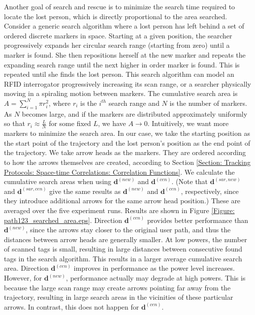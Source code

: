 Another goal of search and rescue is to minimize the search time required to locate the lost person, which is directly proportional to the area searched.  Consider a generic search algorithm where a lost person has left behind a set of ordered discrete markers in space.  Starting at a given position, the searcher progressively expands her circular search range (starting from zero) until a marker is found.  She then repositions herself at the new marker and repeats the expanding search range until the next higher in order marker is found.  This is repeated until she finds the lost person.  This search algorithm can model an RFID interrogator progressively increasing its scan range, or a searcher physically moving in a spiraling motion between markers.  The cumulative search area is $A = \sum_{i = 1}^N \pi r_i^2$, where $r_i$ is the $i^{th}$ search range and $N$ is the number of markers.  As $N$ becomes large, and if the markers are distributed approximately uniformly so that $r_i \approx \frac{L}{N}$ for some fixed $L$, we have $A \rightarrow 0$.  Intuitively, we want more markers to minimize the search area.  In our case, we take the starting position as the start point of the trajectory and the lost person's position as the end point of the trajectory.  We take arrow heads as the markers.  They are ordered according to how the arrows themselves are created, according to Section \ref{Section: Tracking Protocols: Space-time Correlations: Correlation Functions}.  We calculate the cumulative search areas when using $\mathbf{d}^{\left(new\right)}$ and $\mathbf{d}^{\left(cen\right)}$.  (Note that $\mathbf{d}^{\left(sar, new\right)}$ and $\mathbf{d}^{\left(sar, cen\right)}$ give the same results as $\mathbf{d}^{\left(new\right)}$ and $\mathbf{d}^{\left(cen\right)}$, respectively, since they introduce additional arrows for the same arrow head position.)  These are averaged over the five experiment runs.  Results are shown in Figure \ref{Figure: path123_searched_area.eps}. Direction $\mathbf{d}^{\left(cen\right)}$ provides better performance than $\mathbf{d}^{\left(new\right)}$, since the arrows stay closer to the original user path, and thus the distances between arrow heads are generally smaller. At low powers, the number of scanned tags is small, resulting in large distances between consecutive found tags in the search algorithm. This results in a larger average cumulative search area. Direction $\mathbf{d}^{\left(cen\right)}$ improves in performance as the power level increases.  However, for $\mathbf{d}^{\left(new\right)}$, performance actually may degrade at high powers.  This is because the large scan range may create arrows pointing far away from the trajectory, resulting in large search areas in the vicinities of these particular arrows.  In contrast, this does not happen for $\mathbf{d}^{\left(cen\right)}$.

